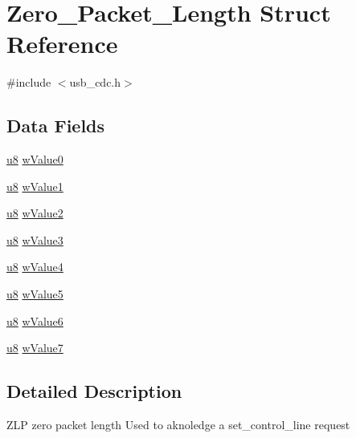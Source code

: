 \hypertarget{struct_zero___packet___length}{\section{Zero\-\_\-\-Packet\-\_\-\-Length Struct Reference}
\label{struct_zero___packet___length}
}


{\ttfamily \#include $<$usb\-\_\-cdc.\-h$>$}

\subsection*{Data Fields}
\begin{DoxyCompactItemize}
\item 
\hyperlink{p8_2pinguino_2core_2typedef_8h_aed742c436da53c1080638ce6ef7d13de}{u8} \hyperlink{struct_zero___packet___length_a9ec22823f856325394796ecddc8c7cee}{w\-Value0}
\item 
\hyperlink{p8_2pinguino_2core_2typedef_8h_aed742c436da53c1080638ce6ef7d13de}{u8} \hyperlink{struct_zero___packet___length_ae02c3c2f43b18232e17336ffe81c72ea}{w\-Value1}
\item 
\hyperlink{p8_2pinguino_2core_2typedef_8h_aed742c436da53c1080638ce6ef7d13de}{u8} \hyperlink{struct_zero___packet___length_a2e657f491dc72495d11d149030c53f29}{w\-Value2}
\item 
\hyperlink{p8_2pinguino_2core_2typedef_8h_aed742c436da53c1080638ce6ef7d13de}{u8} \hyperlink{struct_zero___packet___length_af405b837953c277cf473bd97ced252ac}{w\-Value3}
\item 
\hyperlink{p8_2pinguino_2core_2typedef_8h_aed742c436da53c1080638ce6ef7d13de}{u8} \hyperlink{struct_zero___packet___length_af1066c1be41a960aa7bbb81885aabc65}{w\-Value4}
\item 
\hyperlink{p8_2pinguino_2core_2typedef_8h_aed742c436da53c1080638ce6ef7d13de}{u8} \hyperlink{struct_zero___packet___length_a56adc69236a996c7580c0f7c34619c80}{w\-Value5}
\item 
\hyperlink{p8_2pinguino_2core_2typedef_8h_aed742c436da53c1080638ce6ef7d13de}{u8} \hyperlink{struct_zero___packet___length_a0f411a2df158bdc7c72353da891ed7f8}{w\-Value6}
\item 
\hyperlink{p8_2pinguino_2core_2typedef_8h_aed742c436da53c1080638ce6ef7d13de}{u8} \hyperlink{struct_zero___packet___length_a0e27992794c44a99ffd301d09cd2ed96}{w\-Value7}
\end{DoxyCompactItemize}


\subsection{Detailed Description}
Z\-L\-P zero packet length Used to aknoledge a set\-\_\-control\-\_\-line request 

